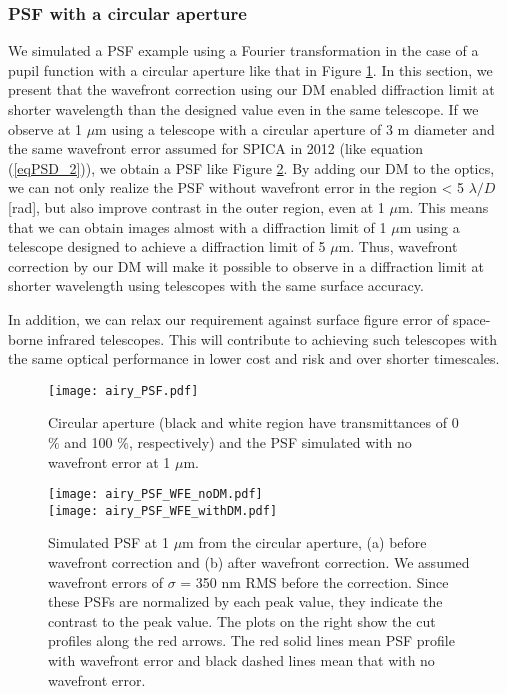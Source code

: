 \documentclass[a4paper]{article}
\begin{document}
\subsubsection{PSF with a circular aperture}
We simulated a PSF example using a Fourier transformation in the case of a pupil function with a circular aperture like that in Figure \ref{Airy_mask_PSF}. In this section, we present that the wavefront correction using our DM enabled diffraction limit at shorter wavelength than the designed value even in the same telescope. If we observe at 1 $\mu$m using a telescope with a circular aperture of 3 m diameter and the same wavefront error assumed for SPICA in 2012 (like equation (\ref{eqPSD_2})), we obtain a PSF like Figure \ref{Airy_PSF_WFC}. By adding our DM to the optics, we can not only realize the PSF without wavefront error in the region < 5 $\lambda/D$ [rad], but also improve contrast in the outer region, even at 1 $\mu$m. This means that we can obtain images almost with a diffraction limit of 1 $\mu$m using a telescope designed to achieve a diffraction limit of 5 $\mu$m. Thus, wavefront correction by our DM will make it possible to observe in a diffraction limit at shorter wavelength using telescopes with the same surface accuracy.

In addition, we can relax our requirement against surface figure error of space-borne infrared telescopes. This will contribute to achieving such telescopes with the same optical performance in lower cost and risk and over shorter timescales.

\begin{figure}[htbp]
\centering
\texttt{[image: airy\_PSF.pdf]}
\caption{Circular aperture (black and white region have transmittances of 0 $\%$ and 100 $\%$, respectively) and the PSF simulated with no wavefront error at 1 $\mu$m.}
\label{Airy_mask_PSF}
\end{figure}

\begin{figure}[htbp]
\centering
\texttt{[image: airy\_PSF\_WFE\_noDM.pdf]}\\
\texttt{[image: airy\_PSF\_WFE\_withDM.pdf]}
\caption{Simulated PSF at 1 $\mu$m from the circular aperture, (a) before wavefront correction and (b) after wavefront correction. We assumed wavefront errors of $\sigma$ = 350 nm RMS before the correction. Since these PSFs are normalized by each peak value, they indicate the contrast to the peak value. The plots on the right show the cut profiles along the red arrows. The red solid lines mean PSF profile with wavefront error and black dashed lines mean that with no wavefront error.}
\label{Airy_PSF_WFC}
\end{figure}
\end{document}
